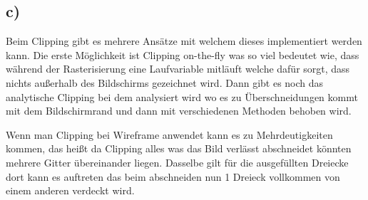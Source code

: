 \documentclass[12pt,pdftex,a4paper]{article}
\begin{document}
\subsection*{c)}
Beim Clipping gibt es mehrere Ansätze mit welchem dieses implementiert werden kann. Die erste Möglichkeit ist Clipping on-the-fly was so viel bedeutet wie, dass während der Rasterisierung eine Laufvariable mitläuft welche dafür sorgt, dass nichts außerhalb des Bildschirms gezeichnet wird.
Dann gibt es noch das analytische Clipping bei dem analysiert wird wo es zu Überschneidungen kommt mit dem Bildschirmrand und dann mit verschiedenen Methoden behoben wird.

Wenn man Clipping bei Wireframe anwendet kann es zu Mehrdeutigkeiten kommen, das heißt da  Clipping alles was das Bild verlässt abschneidet könnten mehrere Gitter übereinander liegen. Dasselbe gilt für die ausgefüllten Dreiecke dort kann es auftreten das beim abschneiden nun 1 Dreieck vollkommen von einem anderen verdeckt wird.
\end{document}
